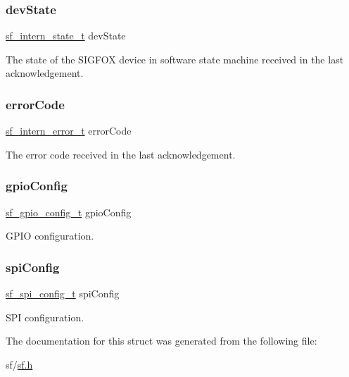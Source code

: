 \subsubsection{\texorpdfstring{devState}{devState}}
{\footnotesize\ttfamily \mbox{\hyperlink{group__sf__enum__group_gaedd94907ea20da8e6d1cd3e3e3282c2c}{sf\+\_\+intern\+\_\+state\+\_\+t}} dev\+State}

The state of the S\+I\+G\+F\+OX device in software state machine received in the last acknowledgement. \mbox{\label{structsf__drv__data__t_ae4b806eb3342162c2058008f9718575d}} 
\subsubsection{\texorpdfstring{errorCode}{errorCode}}
{\footnotesize\ttfamily \mbox{\hyperlink{group__sf__enum__group_ga9f14f69f90dfff97b98977db7a73ba68}{sf\+\_\+intern\+\_\+error\+\_\+t}} error\+Code}

The error code received in the last acknowledgement. \mbox{\label{structsf__drv__data__t_add32ea9a60dd3cf56bce44e4bb31782d}} 
\subsubsection{\texorpdfstring{gpioConfig}{gpioConfig}}
{\footnotesize\ttfamily \mbox{\hyperlink{structsf__gpio__config__t}{sf\+\_\+gpio\+\_\+config\+\_\+t}} gpio\+Config}

G\+P\+IO configuration. \mbox{\label{structsf__drv__data__t_a86cf59ba9cfdafebf74e3cb1a5b2a507}} 
\subsubsection{\texorpdfstring{spiConfig}{spiConfig}}
{\footnotesize\ttfamily \mbox{\hyperlink{structsf__spi__config__t}{sf\+\_\+spi\+\_\+config\+\_\+t}} spi\+Config}

S\+PI configuration. 

The documentation for this struct was generated from the following file\+:\begin{DoxyCompactItemize}
\item 
sf/\mbox{\hyperlink{sf_8h}{sf.\+h}}\end{DoxyCompactItemize}
